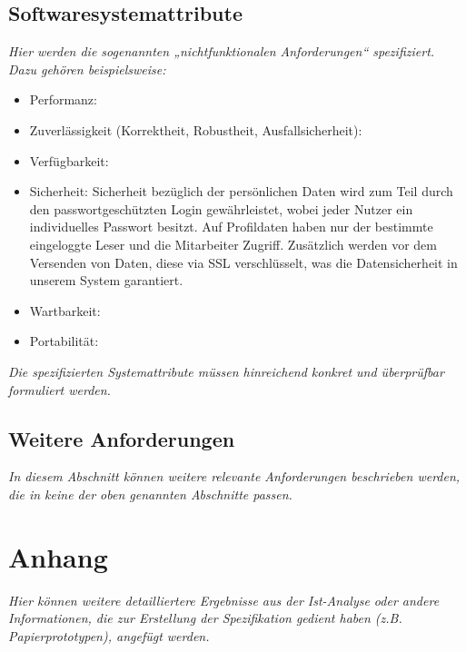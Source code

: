 \documentclass[fontsize=12pt,paper=a4,twoside]{scrartcl}
\begin{document}
\subsection{Softwaresystemattribute}
  {\em Hier werden die sogenannten „nichtfunktionalen Anforderungen“
  spezifiziert. Dazu gehören beispielsweise:
  \begin{itemize}
    \item Performanz:
    \item Zuverlässigkeit (Korrektheit, Robustheit, Ausfallsicherheit):
    \item Verfügbarkeit:
    \item Sicherheit:
     Sicherheit bezüglich der persönlichen Daten wird zum Teil durch den 
     passwortgeschützten Login gewährleistet, wobei jeder Nutzer ein individuelles 
     Passwort besitzt. Auf Profildaten haben nur der bestimmte eingeloggte          
     Leser und die Mitarbeiter Zugriff. Zusätzlich werden vor dem Versenden von Daten, 
     diese via SSL verschlüsselt, was die Datensicherheit in unserem System 
     garantiert.
    \item Wartbarkeit:
    
    \item Portabilität:
    
  \end{itemize}
}

{\em Die spezifizierten Systemattribute müssen hinreichend konkret und
  überprüfbar formuliert werden.}



\subsection{Weitere Anforderungen}


{\em In diesem Abschnitt können weitere relevante Anforderungen
  beschrieben werden, die in keine der oben genannten Abschnitte
  passen.}

\section{Anhang}


{\em Hier können weitere detailliertere Ergebnisse aus der Ist-Analyse
  oder andere Informationen, die zur Erstellung der Spezifikation
  gedient haben (z.B. Papierprototypen), angefügt werden.}
\end{document}
